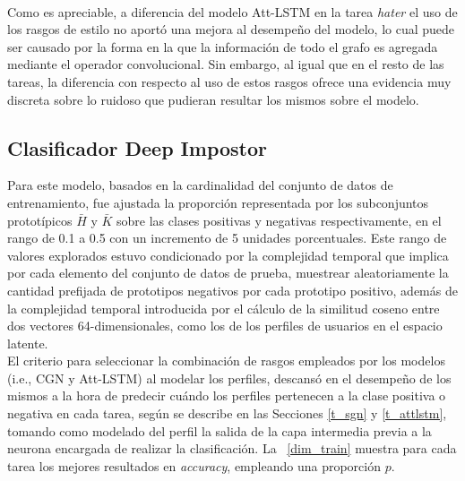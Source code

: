 	\\
	Como es apreciable, a diferencia del modelo Att-LSTM en la tarea \textit{hater} el uso de los rasgos de estilo no aportó una mejora al desempeño del modelo, lo cual puede ser causado por la forma en la que la información de todo el grafo es agregada mediante el operador convolucional. Sin embargo, al igual que en el resto de las tareas, la diferencia con respecto al uso de estos rasgos ofrece una evidencia muy discreta sobre lo ruidoso que pudieran resultar los mismos sobre el modelo.
	
	\subsection{Clasificador Deep Impostor } 	
	
	Para este modelo, basados en la cardinalidad del conjunto de datos de entrenamiento, fue ajustada la proporción representada por los subconjuntos prototípicos $\bar{H}$ y $\bar{K}$ sobre las clases positivas y negativas respectivamente, en el rango de 0.1 a 0.5 con un incremento de 5 unidades porcentuales. Este rango de valores explorados estuvo condicionado por la complejidad temporal que implica por cada elemento del conjunto de datos de prueba, muestrear aleatoriamente la cantidad prefijada de prototipos negativos por cada prototipo positivo, además de la complejidad temporal introducida por el cálculo de la similitud coseno entre dos vectores 64-dimensionales, como los de los perfiles de usuarios en el espacio latente.
	\\
	El criterio para seleccionar la combinación de rasgos empleados por los modelos (i.e., CGN y Att-LSTM) al modelar los perfiles, descansó en el desempeño de los mismos a la hora de predecir cuándo los perfiles pertenecen a la clase positiva o negativa en cada tarea, según se describe en las Secciones \ref{t_sgn} y \ref{t_attlstm}, tomando como modelado del perfil la salida de la capa intermedia previa a la neurona encargada de realizar la clasificación.
	La \tablename~\ref{dim_train} muestra para cada tarea los mejores resultados en \textit{accuracy}, empleando una proporción $p$.	
